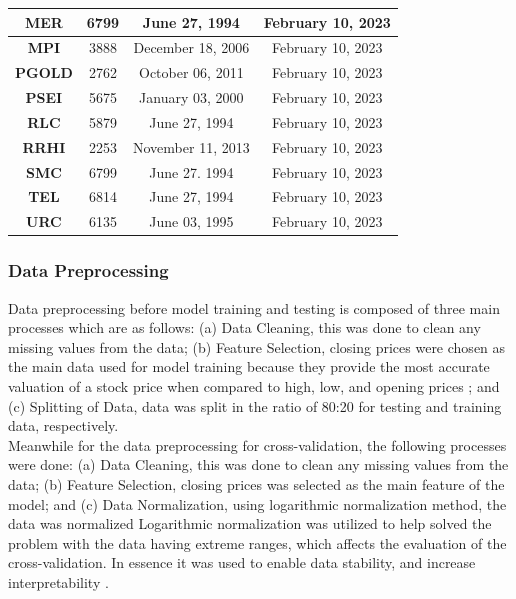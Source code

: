 \begin{longtable}{|c|c|c|c|}
    \textbf{MER}   & 6799                & June 27, 1994       & February 10, 2023 \\ \hline
    \textbf{MPI}   & 3888                & December 18, 2006   & February 10, 2023 \\ \hline
    \textbf{PGOLD} & 2762                & October 06, 2011    & February 10, 2023 \\ \hline
    \rowcolor[HTML]{9AFF99} 
    \textbf{PSEI}  & 5675                & January 03, 2000    & February 10, 2023 \\ \hline
    \textbf{RLC}   & 5879                & June 27, 1994       & February 10, 2023 \\ \hline
    \textbf{RRHI}  & 2253                & November 11, 2013   & February 10, 2023 \\ \hline
    \textbf{SMC}   & 6799                & June 27. 1994       & February 10, 2023 \\ \hline
    \textbf{TEL}   & 6814                & June 27, 1994       & February 10, 2023 \\ \hline
    \textbf{URC}   & 6135                & June 03, 1995       & February 10, 2023 \\ \hline
\end{longtable}

\subsubsection{Data Preprocessing}
\label{subsubsec:model_data_processing}
Data preprocessing before model training and testing is composed of three main processes which are as follows:
(a) Data Cleaning, this was done to clean any missing values from the data;
(b) Feature Selection, closing prices were chosen as the main data 
used for model training because they provide the most accurate 
valuation of a stock price when compared to high, low, and opening 
prices \cite{AdamHayes2021}; and
(c) Splitting of Data, data was split in the ratio of 80:20 for testing and training data, respectively.
\\

Meanwhile for the data preprocessing for cross-validation, the following processes were done:
(a) Data Cleaning, this was done to clean any missing values from the data;
(b) Feature Selection, closing prices was selected as the main feature of the model; and
(c) Data Normalization, using logarithmic normalization method, the data was normalized
Logarithmic normalization was utilized to help solved the problem with the data having extreme ranges,
which affects the evaluation of the cross-validation. In essence it was used to enable data stability, and
increase interpretability \cite{Baeldung2022, Bex2021, Andrew2019}.

